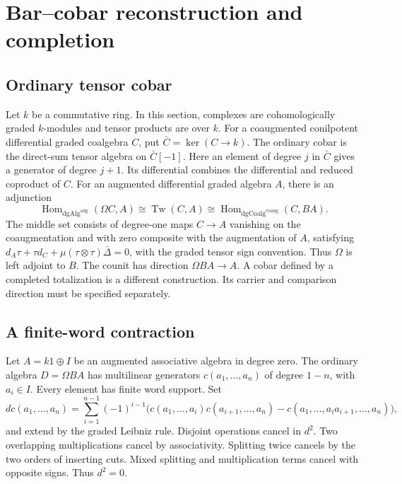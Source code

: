 \chapter{Bar--cobar reconstruction and completion}\label{chap:bar-cobar}

\section{Ordinary tensor cobar}
Let $k$ be a commutative ring. In this section, complexes are cohomologically graded
$k$-modules and tensor products are over $k$.
For a coaugmented conilpotent differential graded coalgebra $C$, put
$\bar C=\ker(C\to k)$.
The ordinary cobar is the direct-sum tensor algebra on $\bar C[-1]$.
Here an element of degree $j$ in $\bar C$ gives a generator of degree $j+1$.
Its differential combines the differential and reduced coproduct of $C$.
For an augmented differential graded algebra $A$, there is an adjunction
\[
 \operatorname{Hom}_{\mathrm{dgAlg}^{\mathrm{aug}}}(\Omega C,A)
 \cong\operatorname{Tw}(C,A)
 \cong\operatorname{Hom}_{\mathrm{dgCoalg}^{\mathrm{coaug}}}(C,BA).
\]
The middle set consists of degree-one maps $C\to A$ vanishing on the coaugmentation and
with zero composite with the augmentation of $A$, satisfying $d_A\tau+\tau d_C+\mu(\tau\otimes\tau)\bar\Delta=0$,
with the graded tensor sign convention.
Thus $\Omega$ is left adjoint to $B$.
The counit has direction $\Omega BA\to A$.
A cobar defined by a completed totalization is a different construction.
Its carrier and comparison direction must be specified separately.

\section{A finite-word contraction}
Let $A=k1\oplus I$ be an augmented associative algebra in degree zero.
The ordinary algebra $D=\Omega BA$ has multilinear generators
$c(a_1,\ldots,a_n)$ of degree $1-n$, with $a_i\in I$.
Every element has finite word support.
Set
\[
 d c(a_1,\ldots,a_n)=\sum_{i=1}^{n-1}(-1)^{i-1}
 \bigl(c(a_1,\ldots,a_i)c(a_{i+1},\ldots,a_n)
       -c(a_1,\ldots,a_i a_{i+1},\ldots,a_n)\bigr),
\]
and extend by the graded Leibniz rule.
Disjoint operations cancel in $d^2$.
Two overlapping multiplications cancel by associativity.
Splitting twice cancels by the two orders of inserting cuts.
Mixed splitting and multiplication terms cancel with opposite signs.
Thus $d^2=0$.

